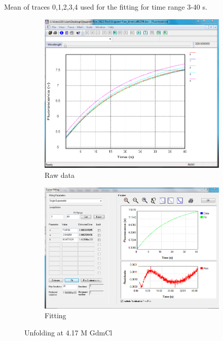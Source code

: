 \documentclass[a4paper,english,12pt,bibliography=totoc]{scrreprt}
\begin{document}
Mean of traces 0,1,2,3,4 used for the fitting for time range 3-40 s.
\begin{figure}[H]
    \centering
    \begin{subfigure}[b]{0.45\textwidth}
        \centering
        \includegraphics[width=\textwidth]{Images/G8/uf5_raw.PNG}
        \caption{Raw data }
        \label{fig:sub1}
    \end{subfigure}
    \hspace{0cm} %
    \begin{subfigure}[b]{0.45\textwidth}
        \centering
        \includegraphics[width=\textwidth]{Images/G8/uf5_fitting.PNG}
        \caption{Fitting}
        \label{fig:sub2}
    \end{subfigure}
    \caption{Unfolding at 4.17 M GdmCl }
    \label{fig:main}
\end{figure}
\end{document}
